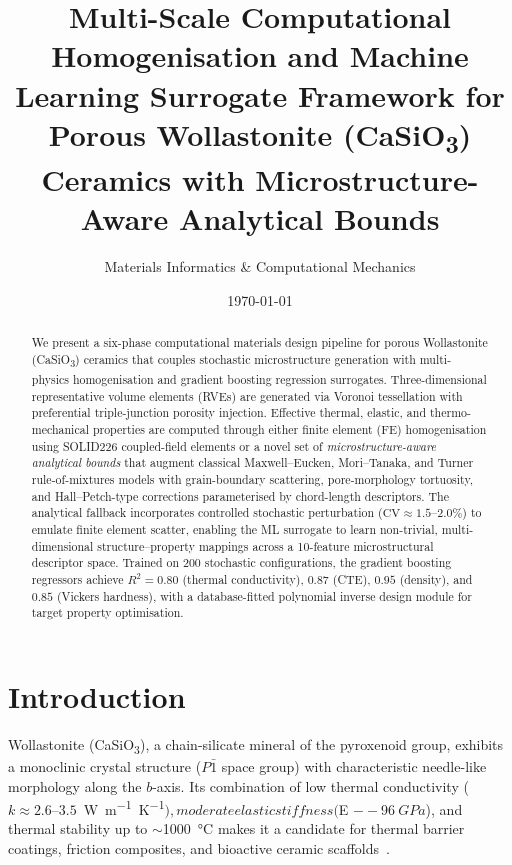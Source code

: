 \documentclass[11pt,a4paper]{article}
\title{Multi-Scale Computational Homogenisation and Machine Learning Surrogate Framework for Porous Wollastonite (CaSiO\textsubscript{3}) Ceramics with Microstructure-Aware Analytical Bounds}
\author{Materials Informatics \& Computational Mechanics}
\date{\today}
\begin{document}
\maketitle

\begin{abstract}
We present a six-phase computational materials design pipeline for porous Wollastonite (CaSiO\textsubscript{3}) ceramics that couples stochastic microstructure generation with multi-physics homogenisation and gradient boosting regression surrogates. Three-dimensional representative volume elements (RVEs) are generated via Voronoi tessellation with preferential triple-junction porosity injection. Effective thermal, elastic, and thermo-mechanical properties are computed through either finite element (FE) homogenisation using SOLID226 coupled-field elements or a novel set of \emph{microstructure-aware analytical bounds} that augment classical Maxwell--Eucken, Mori--Tanaka, and Turner rule-of-mixtures models with grain-boundary scattering, pore-morphology tortuosity, and Hall--Petch-type corrections parameterised by chord-length descriptors. The analytical fallback incorporates controlled stochastic perturbation ($\text{CV} \approx 1.5$--$2.0\%$) to emulate finite element scatter, enabling the ML surrogate to learn non-trivial, multi-dimensional structure--property mappings across a 10-feature microstructural descriptor space. Trained on 200 stochastic configurations, the gradient boosting regressors achieve $R^2 = 0.80$ (thermal conductivity), $0.87$ (CTE), $0.95$ (density), and $0.85$ (Vickers hardness), with a database-fitted polynomial inverse design module for target property optimisation.
\end{abstract}

\section{Introduction}
\label{sec:intro}

Wollastonite (CaSiO\textsubscript{3}), a chain-silicate mineral of the pyroxenoid group, exhibits a monoclinic crystal structure ($P\bar{1}$ space group) with characteristic needle-like morphology along the $b$-axis. Its combination of low thermal conductivity ($k \approx 2.6$--$3.5$~\si{W.m^{-1}.K^{-1}}$), moderate elastic stiffness ($E $--$96$~\si{GPa}$), and thermal stability up to $\sim$\SI{1000}{\celsius} makes it a candidate for thermal barrier coatings, friction composites, and bioactive ceramic scaffolds~\cite{pirkelmann2023}.
\end{document}
